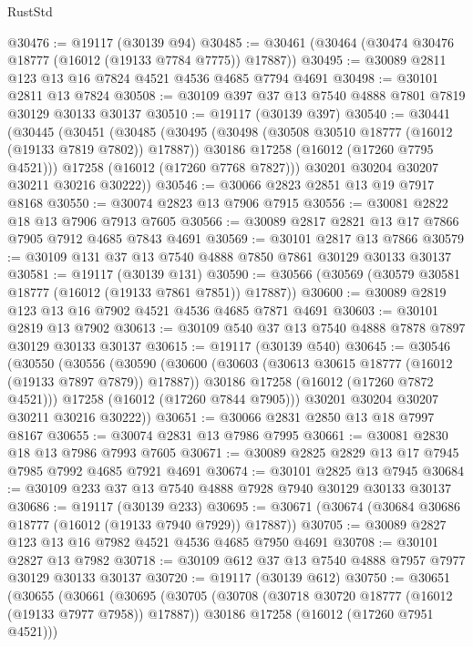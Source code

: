 \begin{lexlean}{RustStd}
\begin{coremodule}
@30476 := @19117 (@30139 @94)
@30485 := @30461 (@30464 (@30474 @30476 @18777 (@16012 (@19133 @7784 @7775)) @17887))
@30495 := @30089 @2811 @123 @13 @16 @7824 @4521 @4536 @4685 @7794 @4691
@30498 := @30101 @2811 @13 @7824
@30508 := @30109 @397 @37 @13 @7540 @4888 @7801 @7819 @30129 @30133 @30137
@30510 := @19117 (@30139 @397)
@30540 := @30441
    (@30445
      (@30451
        (@30485
          (@30495
            (@30498 (@30508 @30510 @18777 (@16012 (@19133 @7819 @7802)) @17887))
            @30186
            @17258
            (@16012 (@17260 @7795 @4521)))
          @17258
          (@16012 (@17260 @7768 @7827)))
        @30201
        @30204
        @30207
        @30211
        @30216
        @30222))
@30546 := @30066 @2823 @2851 @13 @19 @7917 @8168
@30550 := @30074 @2823 @13 @7906 @7915
@30556 := @30081 @2822 @18 @13 @7906 @7913 @7605
@30566 := @30089 @2817 @2821 @13 @17 @7866 @7905 @7912 @4685 @7843 @4691
@30569 := @30101 @2817 @13 @7866
@30579 := @30109 @131 @37 @13 @7540 @4888 @7850 @7861 @30129 @30133 @30137
@30581 := @19117 (@30139 @131)
@30590 := @30566 (@30569 (@30579 @30581 @18777 (@16012 (@19133 @7861 @7851)) @17887))
@30600 := @30089 @2819 @123 @13 @16 @7902 @4521 @4536 @4685 @7871 @4691
@30603 := @30101 @2819 @13 @7902
@30613 := @30109 @540 @37 @13 @7540 @4888 @7878 @7897 @30129 @30133 @30137
@30615 := @19117 (@30139 @540)
@30645 := @30546
    (@30550
      (@30556
        (@30590
          (@30600
            (@30603 (@30613 @30615 @18777 (@16012 (@19133 @7897 @7879)) @17887))
            @30186
            @17258
            (@16012 (@17260 @7872 @4521)))
          @17258
          (@16012 (@17260 @7844 @7905)))
        @30201
        @30204
        @30207
        @30211
        @30216
        @30222))
@30651 := @30066 @2831 @2850 @13 @18 @7997 @8167
@30655 := @30074 @2831 @13 @7986 @7995
@30661 := @30081 @2830 @18 @13 @7986 @7993 @7605
@30671 := @30089 @2825 @2829 @13 @17 @7945 @7985 @7992 @4685 @7921 @4691
@30674 := @30101 @2825 @13 @7945
@30684 := @30109 @233 @37 @13 @7540 @4888 @7928 @7940 @30129 @30133 @30137
@30686 := @19117 (@30139 @233)
@30695 := @30671 (@30674 (@30684 @30686 @18777 (@16012 (@19133 @7940 @7929)) @17887))
@30705 := @30089 @2827 @123 @13 @16 @7982 @4521 @4536 @4685 @7950 @4691
@30708 := @30101 @2827 @13 @7982
@30718 := @30109 @612 @37 @13 @7540 @4888 @7957 @7977 @30129 @30133 @30137
@30720 := @19117 (@30139 @612)
@30750 := @30651
    (@30655
      (@30661
        (@30695
          (@30705
            (@30708 (@30718 @30720 @18777 (@16012 (@19133 @7977 @7958)) @17887))
            @30186
            @17258
            (@16012 (@17260 @7951 @4521)))

\end{coremodule}
\end{lexlean}
